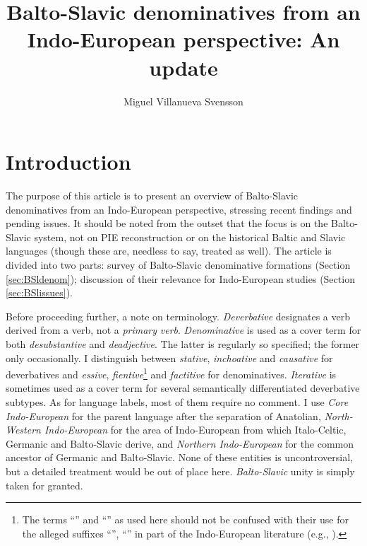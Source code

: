 \documentclass[output=paper,colorlinks,citecolor=brown]{langscibook}
\author{Miguel Villanueva Svensson\orcid{}\affiliation{Vilnius University}}
\title{Balto-Slavic denominatives from an Indo-European perspective: An update}
\begin{document}
\maketitle

\section{Introduction}
\label{sec:BSlIntro}

The purpose of this article is to present an overview of Balto-Slavic denominatives from an Indo-European perspective, stressing recent findings and pending issues. It should be noted from the outset that the focus is on the Balto-Slavic system, not on PIE reconstruction or on the historical Baltic and Slavic languages (though these are, needless to say, treated as well). The article is divided into two parts: survey of Balto-Slavic denominative formations (Section \ref{sec:BSldenom}); discussion of their relevance for Indo-European studies (Section \ref{sec:BSlissues}).

Before proceeding further, a note on terminology. \textit{Deverbative} designates a verb derived from a verb, not a \textit{primary} \textit{verb}. \textit{Denominative} is used as a cover term for both \textit{desubstantive} and \textit{deadjective}. The latter is regularly so specified; the former only occasionally. I distinguish between \textit{stative}, \textit{inchoative} and \textit{causative} for deverbatives and \textit{essive},  \textit{fientive}\footnote{The terms “” and “” as used here should not be confused with their use for the alleged suffixes “”, “” in part of the Indo-European literature (e.g., ).} and \textit{factitive} for denominatives. \textit{Iterative} is sometimes used as a cover term for several semantically differentiated deverbative subtypes. As for language labels, most of them require no comment. I use \textit{Core Indo-European} for the parent language after the separation of Anatolian, \textit{North-Western Indo-European} for the area of Indo-European from which Italo-Celtic, Germanic and Balto-Slavic derive, and \textit{Northern Indo-European} for the common ancestor of Germanic and Balto-Slavic. None of these entities is uncontroversial, but a detailed treatment would be out of place here. \textit{Balto-Slavic} unity is simply taken for granted.
\end{document}
